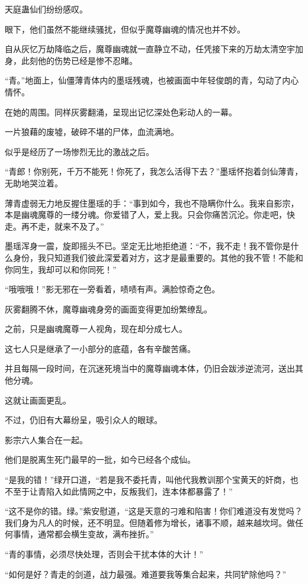 \begin{this_body}
天庭蛊仙们纷纷感叹。

眼下，他们虽然不能继续骚扰，但似乎魔尊幽魂的情况也并不妙。

自从灰忆万劫降临之后，魔尊幽魂就一直静立不动，任凭接下来的万劫太清空宇加身，此刻他的伤势已经是惨不忍睹。

“青。”地面上，仙僵薄青体内的墨瑶残魂，也被画面中年轻俊朗的青，勾动了内心情怀。

在她的周围。同样灰雾翻涌，呈现出记忆深处色彩动人的一幕。

一片狼藉的废墟，破碎不堪的尸体，血流满地。

似乎是经历了一场惨烈无比的激战之后。

“青郎！你别死，千万不能死！你死了，我怎么活得下去？”墨瑶怀抱着剑仙薄青，无助地哭泣着。

薄青虚弱无力地反握住墨瑶的手：“事到如今，我也不隐瞒你什么。我来自影宗，本是幽魂魔尊的一缕分魂。你爱错了人，爱上我。只会你痛苦沉沦。你走吧，快走。再不走，就来不及了。”

墨瑶浑身一震，旋即摇头不已。坚定无比地拒绝道：“不，我不走！我不管你是什么身份，我只知道我们彼此深爱着对方，这才是最重要的。其他的我不管！不能和你同生，我却可以和你同死！”

“哦哦哦！”影无邪在一旁看着，啧啧有声。满脸惊奇之色。

灰雾翻腾不休，魔尊幽魂身旁的画面变得更加纷繁缭乱。

之前，只是幽魂魔尊一人视角，现在却分成七人。

这七人只是继承了一小部分的底蕴，各有辛酸苦痛。

并且每隔一段时间，在沉迷死境当中的魔尊幽魂本体，仍旧会跋涉逆流河，送出其他分魂。

这就让画面更乱。

不过，仍旧有大幕纷呈，吸引众人的眼球。

影宗六人集合在一起。

他们是脱离生死门最早的一批，如今已经各个成仙。

“是我的错！”绿开口道，“若是我不委托青，叫他代我教训那个宝黄天的奸商，也不至于让青陷入如此情网之中，反叛我们，连本体都暴露了！”

“这不是你的错。绿。”紫安慰道，“这是天意的刁难和陷害！你们难道没有发觉吗？我们身为凡人的时候，还不明显。但随着修为增长，诸事不顺，越来越坎坷。做任何事情，通常都会横生变故，满布挫折。”

“青的事情，必须尽快处理，否则会干扰本体的大计！”

“如何是好？青走的剑道，战力最强。难道要我等集合起来，共同铲除他吗？”


\end{this_body}
